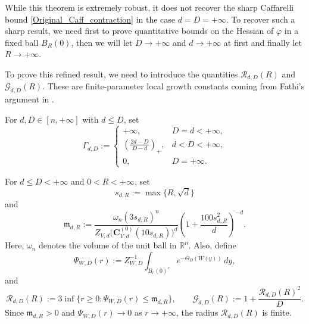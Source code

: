 \documentclass[11pt,a4paper,reqno]{amsart}
\numberwithin{equation}{section}
\theoremstyle{definition}
\newcommand{\<}{\ensuremath \leq}
\renewcommand{\>}{\ensuremath \geq}
\newcommand{\ThetaPar}{\Theta}
\newcommand{\Znorm}[2]{Z_{#1,#2}}
\newcommand{\CVp}[1]{\mathbf{C}_{V,#1}}
\begin{document}
While this theorem is extremely robust, it does not recover the sharp Caffarelli bound \eqref{Original_Caff_contraction} in the case $d=D=+\infty$. To recover such a sharp result, we need first to prove quantitative bounds on the Hessian of $\varphi$ in a fixed ball $B_R(0)$, then we will let $D\to+\infty$ and $d\to+\infty$ at first and finally let $R\to+\infty$.

To prove this refined result, we need to introduce the quantities $\mathcal R_{d,D}(R)$ and $\mathcal G_{d,D}(R)$. These are finite-parameter local growth constants coming from Fathi's argument in \cite{Fathi}.

For $d,D\in[n,+\infty]$ with $d\le D$, set
\begin{equation}\label{Gamma_definition}
\Gamma_{d,D}:=
\begin{cases}
\displaystyle
+\infty, & D=d<+\infty,\\[0.8em]
\displaystyle
\left(\frac{2d-D}{D-d}\right)_+, & d<D<+\infty,\\[0.8em]
0, & D=+\infty.
\end{cases}
\end{equation}

For $d\le D<+\infty$ and $0<R<+\infty$, set
\[
    s_{d,R}:=\max\{R,\sqrt d\}
\]
and
\[
    \mathfrak m_{d,R}:=
    \frac{\omega_n(3s_{d,R})^n}{\Znorm{V}{d}\bigl(\CVp{d}^{(0)}(10s_{d,R})\bigr)^d}
    \left(1+\frac{100s_{d,R}^2}{d}\right)^{-d}.
\]
Here, $\omega_n$ denotes the volume of the unit ball in $\mathbb{R}^n$.
Also, define
\[
    \Psi_{W,D}(r):=
    \Znorm{W}{D}^{-1}\int_{B_r(0)^c}e^{-\ThetaPar_D(W(y))}\,dy,
\]
and
\begin{equation}\label{eq:RG}
    \mathcal R_{d,D}(R):=
    3\inf\{r\ge0:\Psi_{W,D}(r)\le \mathfrak m_{d,R}\},\qquad
    \mathcal G_{d,D}(R):=1+\frac{\mathcal R_{d,D}(R)^2}{D}.
\end{equation}
Since $\mathfrak m_{d,R}>0$ and $\Psi_{W,D}(r)\to0$ as $r\to+\infty$, the radius $\mathcal R_{d,D}(R)$ is finite.
\end{document}
